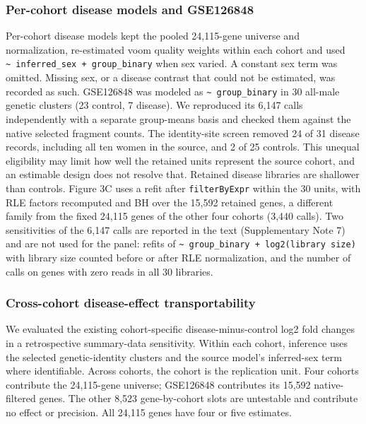 \subsubsection{Per-cohort disease models and GSE126848}\label{per-cohort-disease-models-and-gse126848}

Per-cohort disease models kept the pooled 24,115-gene universe and normalization, re-estimated voom quality weights within each cohort and used \texttt{\textasciitilde{}\ inferred\_\allowbreak{}sex\ +\ group\_\allowbreak{}binary} when sex varied. A constant sex term was omitted. Missing sex, or a disease contrast that could not be estimated, was recorded as such. GSE126848 was modeled as \texttt{\textasciitilde{}\ group\_\allowbreak{}binary} in 30 all-male genetic clusters (23 control, 7 disease). We reproduced its 6,147 calls independently with a separate group-means basis and checked them against the native selected fragment counts. The identity-site screen removed 24 of 31 disease records, including all ten women in the source, and 2 of 25 controls. This unequal eligibility may limit how well the retained units represent the source cohort, and an estimable design does not resolve that. Retained disease libraries are shallower than controls. Figure 3C uses a refit after \texttt{filterByExpr} within the 30 units, with RLE factors recomputed and BH over the 15,592 retained genes, a different family from the fixed 24,115 genes of the other four cohorts (3,440 calls). Two sensitivities of the 6,147 calls are reported in the text (Supplementary Note 7) and are not used for the panel: refits of \texttt{\textasciitilde{}\ group\_\allowbreak{}binary\ +\ log2(library\ size)} with library size counted before or after RLE normalization, and the number of calls on genes with zero reads in all 30 libraries.

\subsubsection{Cross-cohort disease-effect transportability}\label{cross-cohort-disease-effect-transportability}

We evaluated the existing cohort-specific disease-minus-control log2 fold changes
in a retrospective summary-data sensitivity. Within each cohort, inference uses
the selected genetic-identity clusters and the source model's inferred-sex term
where identifiable. Across cohorts, the cohort is the replication unit. Four
cohorts contribute the 24,115-gene universe; GSE126848 contributes its 15,592
native-filtered genes. The other 8,523 gene-by-cohort slots are untestable and
contribute no effect or precision. All 24,115 genes have four or five estimates.

